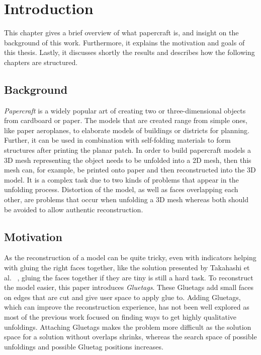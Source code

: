 \documentclass[draft,final]{vutinfth} %
\begin{document}

\tableofcontents %

\mainmatter

\chapter{Introduction}
This chapter gives a brief overview of what papercraft is, and insight on the background of this work. Furthermore, it explains the motivation and goals of this thesis. Lastly, it discusses shortly the results and describes how the following chapters are structured.

\section{Background}
\textit{Papercraft} is a widely popular art of creating two or three-dimensional objects from cardboard or paper. The models that are created range from simple ones, like paper aeroplanes, to elaborate models of buildings or districts for planning. Further, it can be used in combination with self-folding materials to form structures after printing the planar patch. In order to build papercraft models a 3D mesh representing the object needs to be unfolded into a 2D mesh, then this mesh can, for example, be printed onto paper and then reconstructed into the 3D model. It is a complex task due to two kinds of problems that appear in the unfolding process. Distortion of the model, as well as faces overlapping each other, are problems that occur when unfolding a 3D mesh whereas both should be avoided to allow authentic reconstruction.

\section{Motivation}
As the reconstruction of a model can be quite tricky, even with indicators helping with gluing the right faces together, like the solution presented by Takahashi et al.
~\cite{takahashi2011optimized}, gluing the faces together if they are tiny is still a hard task.
To reconstruct the model easier, this paper introduces \textit{Gluetags}. These Gluetags add small faces on edges that are cut and give user space to apply glue to. Adding Gluetags, which can improve the reconstruction experience, has not been well explored as most of the previous work focused on finding ways to get highly qualitative unfoldings. Attaching Gluetags makes the problem more difficult as the solution space for a solution without overlaps shrinks, whereas the search space of possible unfoldings and possible Gluetag positions increases.
\end{document}
